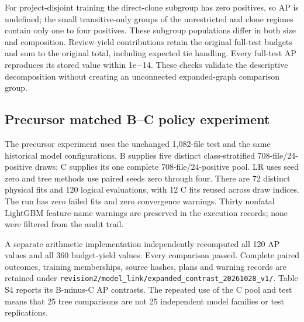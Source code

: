 \documentclass[preprint,12pt]{elsarticle}
\begin{document}
For project-disjoint training the direct-clone subgroup has zero positives, so AP is undefined; the small transitive-only groups of the unrestricted and clone regimes contain only one to four positives. These subgroup populations differ in both size and composition. Review-yield contributions retain the original full-test budgets and sum to the original total, including expected tie handling. Every full-test AP reproduces its stored value within 1e−14. These checks validate the descriptive decomposition without creating an unconnected expanded-graph comparison group.

\subsection{Precursor matched B--C policy experiment}\label{precursor-matched-bc-policy-experiment}

The precursor experiment uses the unchanged 1,082-file test and the same historical model configurations. B supplies five distinct class-stratified 708-file/24-positive draws; C supplies its one complete 708-file/24-positive pool. LR uses seed zero and tree methods use paired seeds zero through four. There are 72 distinct physical fits and 120 logical evaluations, with 12 C fits reused across draw indices. The run has zero failed fits and zero convergence warnings. Thirty nonfatal LightGBM feature-name warnings are preserved in the execution records; none were filtered from the audit trail.

A separate arithmetic implementation independently recomputed all 120 AP values and all 360 budget-yield values. Every comparison passed. Complete paired outcomes, training memberships, source hashes, plans and warning records are retained under \nolinkurl{revision2/model_link/expanded_contrast_20261028_v1/}. Table S4 reports its B-minus-C AP contrasts. The repeated use of the C pool and test means that 25 tree comparisons are not 25 independent model families or test replications.
\end{document}
